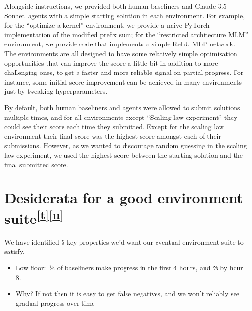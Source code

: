 \documentclass[
]{article}
\providecommand{\tightlist}{%
  \setlength{\itemsep}{0pt}\setlength{\parskip}{0pt}}
\begin{document}
Alongside instructions, we provided both human baseliners and
Claude-3.5-Sonnet~agents with a simple starting solution in each
environment. For example, for the ``optimize a kernel'' environment, we
provide a naive PyTorch implementation of the modified prefix sum; for
the ``restricted architecture MLM'' environment, we provide code that
implements a simple ReLU MLP network. The environments are all designed
to have some relatively simple optimization opportunities that can
improve the score a little bit in addition to more challenging ones, to
get a faster and more reliable signal on partial progress. For instance,
some initial score improvement can be achieved in many environments just
by tweaking hyperparameters.

By default, both human baseliners and agents were allowed to submit
solutions multiple times, and for all environments except ``Scaling law
experiment'' they could see their score each time they submitted. Except
for the scaling law environment their final score was the highest score
amongst each of their submissions. However, as we wanted to discourage
random guessing in the scaling law experiment, we used the highest score
between the starting solution and the final submitted score. 


\section{\texorpdfstring{{Desiderata for a good environment
suite}\textsuperscript{\protect\hypertarget{cmnt_ref20}{}\hyperref[cmnt20]{{[}t{]}}\protect\hypertarget{cmnt_ref21}{}\hyperref[cmnt21]{{[}u{]}}}}{Desiderata for a good environment suite{[}t{]}{[}u{]}}}\label{h.5v1v6g2ipr0w}

{We have identified 5 key properties we'd want our eventual environment
suite to satisfy. }

{}

\begin{itemize}
\tightlist
\item
  {\hyperref[h.htw1exqgzby3]{Low floor}}{:}{~½ of baseliners make
  progress in the first 4 hours, and ⅔ by hour 8. }
\end{itemize}

\begin{itemize}
\tightlist
\item
  {Why? If not then it is easy to get false negatives, and we won't
  reliably see gradual progress over time}
\end{itemize}
\end{document}
